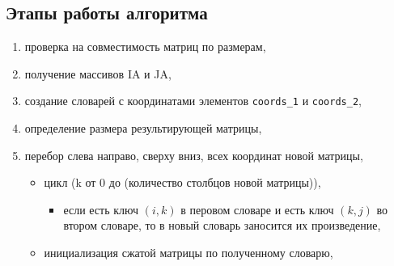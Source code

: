 \subsection*{Этапы работы алгоритма}
\begin{enumerate}
	\item проверка на совместимость матриц по размерам,
	
	\item получение массивов IA и JA,
	
	\item создание словарей с координатами элементов \texttt{coords\_1} и \texttt{coords\_2},
	
	\item определение размера результирующей матрицы,
	
	\item перебор слева направо, сверху  вниз, всех координат новой матрицы,
	\begin{itemize}
		\item цикл (k от 0 до (количество столбцов новой матрицы)), 
		\begin{itemize}
			\item если есть ключ $(i, k)$  в перовом словаре и есть ключ $(k, j)$ во втором словаре, то в новый словарь заносится их произведение,
		\end{itemize}
		\item инициализация сжатой матрицы по полученному словарю, 
	\end{itemize}
\end{enumerate}


\clearpage
